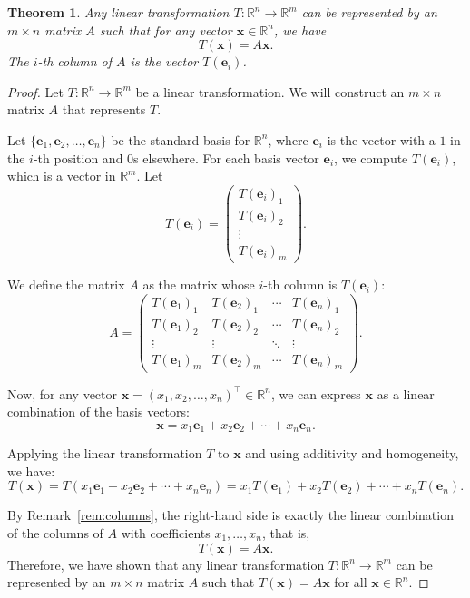 \documentclass[11pt]{article}
\theoremstyle{definition}
\theoremstyle{plain}
\newtheorem{theorem}[definition]{Theorem}
\theoremstyle{remark}
\begin{document}
\begin{theorem}\label{thm:matrix}
    Any linear transformation $T: \mathbb{R}^n \to \mathbb{R}^m$ can be represented by an $m \times n$ matrix $A$ such that for any vector $\mathbf{x} \in \mathbb{R}^n$, we have
    \[T(\mathbf{x}) = A\mathbf{x}.\]
    The $i$-th column of $A$ is the vector $T(\mathbf{e}_i)$.
\end{theorem}

\begin{proof}
    Let $T: \mathbb{R}^n \to \mathbb{R}^m$ be a linear transformation. We will construct an $m \times n$ matrix $A$ that represents $T$.

    Let $\{\mathbf{e}_1, \mathbf{e}_2, \ldots, \mathbf{e}_n\}$ be the standard basis for $\mathbb{R}^n$, where $\mathbf{e}_i$ is the vector with a $1$ in the $i$-th position and $0$s elsewhere. For each basis vector $\mathbf{e}_i$, we compute $T(\mathbf{e}_i)$, which is a vector in $\mathbb{R}^m$. Let
    \[T(\mathbf{e}_i) = \begin{pmatrix}
        T(\mathbf{e}_i)_1 \\
        T(\mathbf{e}_i)_2 \\
        \vdots \\
        T(\mathbf{e}_i)_m
    \end{pmatrix}.\]

    We define the matrix $A$ as the matrix whose $i$-th column is $T(\mathbf{e}_i)$:
    \[A = \begin{pmatrix}
        T(\mathbf{e}_1)_1 & T(\mathbf{e}_2)_1 & \cdots & T(\mathbf{e}_n)_1 \\
        T(\mathbf{e}_1)_2 & T(\mathbf{e}_2)_2 & \cdots & T(\mathbf{e}_n)_2 \\
        \vdots & \vdots & \ddots & \vdots \\
        T(\mathbf{e}_1)_m & T(\mathbf{e}_2)_m & \cdots & T(\mathbf{e}_n)_m
    \end{pmatrix}.\]

    Now, for any vector $\mathbf{x} = (x_1, x_2, \ldots, x_n)^\top \in \mathbb{R}^n$, we can express $\mathbf{x}$ as a linear combination of the basis vectors:
    \[\mathbf{x} = x_1 \mathbf{e}_1 + x_2 \mathbf{e}_2 + \cdots + x_n \mathbf{e}_n.\]

    Applying the linear transformation $T$ to $\mathbf{x}$ and using additivity and homogeneity, we have:
    \[T(\mathbf{x}) = T(x_1 \mathbf{e}_1 + x_2 \mathbf{e}_2 + \cdots + x_n \mathbf{e}_n) = x_1 T(\mathbf{e}_1) + x_2 T(\mathbf{e}_2) + \cdots + x_n T(\mathbf{e}_n).\]

    By Remark~\ref{rem:columns}, the right-hand side is exactly the linear combination of the columns of $A$ with coefficients $x_1, \ldots, x_n$, that is,
    \[T(\mathbf{x}) = A \mathbf{x}.\]
    Therefore, we have shown that any linear transformation $T: \mathbb{R}^n \to \mathbb{R}^m$ can be represented by an $m \times n$ matrix $A$ such that $T(\mathbf{x}) = A\mathbf{x}$ for all $\mathbf{x} \in \mathbb{R}^n$.
\end{proof}
\end{document}
